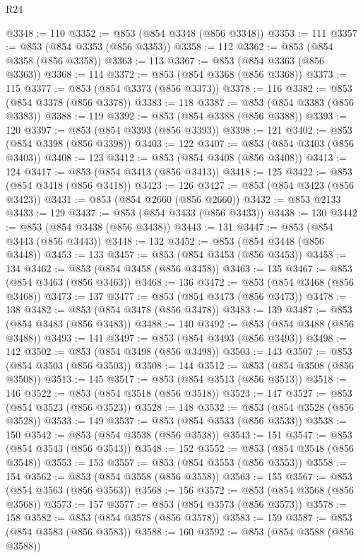 \begin{lexlean}{R24}
\begin{coremodule}
@3348 := 110
@3352 := @853 (@854 @3348 (@856 @3348))
@3353 := 111
@3357 := @853 (@854 @3353 (@856 @3353))
@3358 := 112
@3362 := @853 (@854 @3358 (@856 @3358))
@3363 := 113
@3367 := @853 (@854 @3363 (@856 @3363))
@3368 := 114
@3372 := @853 (@854 @3368 (@856 @3368))
@3373 := 115
@3377 := @853 (@854 @3373 (@856 @3373))
@3378 := 116
@3382 := @853 (@854 @3378 (@856 @3378))
@3383 := 118
@3387 := @853 (@854 @3383 (@856 @3383))
@3388 := 119
@3392 := @853 (@854 @3388 (@856 @3388))
@3393 := 120
@3397 := @853 (@854 @3393 (@856 @3393))
@3398 := 121
@3402 := @853 (@854 @3398 (@856 @3398))
@3403 := 122
@3407 := @853 (@854 @3403 (@856 @3403))
@3408 := 123
@3412 := @853 (@854 @3408 (@856 @3408))
@3413 := 124
@3417 := @853 (@854 @3413 (@856 @3413))
@3418 := 125
@3422 := @853 (@854 @3418 (@856 @3418))
@3423 := 126
@3427 := @853 (@854 @3423 (@856 @3423))
@3431 := @853 (@854 @2660 (@856 @2660))
@3432 := @853 @2133
@3433 := 129
@3437 := @853 (@854 @3433 (@856 @3433))
@3438 := 130
@3442 := @853 (@854 @3438 (@856 @3438))
@3443 := 131
@3447 := @853 (@854 @3443 (@856 @3443))
@3448 := 132
@3452 := @853 (@854 @3448 (@856 @3448))
@3453 := 133
@3457 := @853 (@854 @3453 (@856 @3453))
@3458 := 134
@3462 := @853 (@854 @3458 (@856 @3458))
@3463 := 135
@3467 := @853 (@854 @3463 (@856 @3463))
@3468 := 136
@3472 := @853 (@854 @3468 (@856 @3468))
@3473 := 137
@3477 := @853 (@854 @3473 (@856 @3473))
@3478 := 138
@3482 := @853 (@854 @3478 (@856 @3478))
@3483 := 139
@3487 := @853 (@854 @3483 (@856 @3483))
@3488 := 140
@3492 := @853 (@854 @3488 (@856 @3488))
@3493 := 141
@3497 := @853 (@854 @3493 (@856 @3493))
@3498 := 142
@3502 := @853 (@854 @3498 (@856 @3498))
@3503 := 143
@3507 := @853 (@854 @3503 (@856 @3503))
@3508 := 144
@3512 := @853 (@854 @3508 (@856 @3508))
@3513 := 145
@3517 := @853 (@854 @3513 (@856 @3513))
@3518 := 146
@3522 := @853 (@854 @3518 (@856 @3518))
@3523 := 147
@3527 := @853 (@854 @3523 (@856 @3523))
@3528 := 148
@3532 := @853 (@854 @3528 (@856 @3528))
@3533 := 149
@3537 := @853 (@854 @3533 (@856 @3533))
@3538 := 150
@3542 := @853 (@854 @3538 (@856 @3538))
@3543 := 151
@3547 := @853 (@854 @3543 (@856 @3543))
@3548 := 152
@3552 := @853 (@854 @3548 (@856 @3548))
@3553 := 153
@3557 := @853 (@854 @3553 (@856 @3553))
@3558 := 154
@3562 := @853 (@854 @3558 (@856 @3558))
@3563 := 155
@3567 := @853 (@854 @3563 (@856 @3563))
@3568 := 156
@3572 := @853 (@854 @3568 (@856 @3568))
@3573 := 157
@3577 := @853 (@854 @3573 (@856 @3573))
@3578 := 158
@3582 := @853 (@854 @3578 (@856 @3578))
@3583 := 159
@3587 := @853 (@854 @3583 (@856 @3583))
@3588 := 160
@3592 := @853 (@854 @3588 (@856 @3588))

\end{coremodule}
\end{lexlean}

